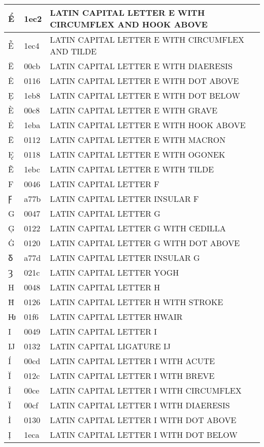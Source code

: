 \documentclass[12pt,letterpaper,openany]{book}
\begin{document}
\begin{center}
\begin{supertabular}{|m{0.25in}|m{0.5in}|m{4in}|}
Ể & 1ec2 & \scriptsize LATIN CAPITAL LETTER E WITH CIRCUMFLEX AND HOOK ABOVE\\\hline
Ễ & 1ec4 & LATIN CAPITAL LETTER E WITH CIRCUMFLEX AND TILDE\\\hline
Ë & 00cb & LATIN CAPITAL LETTER E WITH DIAERESIS\\\hline
Ė & 0116 & LATIN CAPITAL LETTER E WITH DOT ABOVE\\\hline
Ẹ & 1eb8 & LATIN CAPITAL LETTER E WITH DOT BELOW\\\hline
È & 00c8 & LATIN CAPITAL LETTER E WITH GRAVE\\\hline
Ẻ & 1eba & LATIN CAPITAL LETTER E WITH HOOK ABOVE\\\hline
Ē & 0112 & LATIN CAPITAL LETTER E WITH MACRON\\\hline
Ę & 0118 & LATIN CAPITAL LETTER E WITH OGONEK\\\hline
Ẽ & 1ebc & LATIN CAPITAL LETTER E WITH TILDE\\\hline
F & 0046 & LATIN CAPITAL LETTER F\\\hline
Ꝼ & a77b & LATIN CAPITAL LETTER INSULAR F\\\hline
G & 0047 & LATIN CAPITAL LETTER G\\\hline
Ģ & 0122 & LATIN CAPITAL LETTER G WITH CEDILLA\\\hline
Ġ & 0120 & LATIN CAPITAL LETTER G WITH DOT ABOVE\\\hline
Ᵹ & a77d & LATIN CAPITAL LETTER INSULAR G\\\hline
Ȝ & 021c & LATIN CAPITAL LETTER YOGH\\\hline
H & 0048 & LATIN CAPITAL LETTER H\\\hline
Ħ & 0126 & LATIN CAPITAL LETTER H WITH STROKE\\\hline
Ƕ & 01f6 & LATIN CAPITAL LETTER HWAIR\\\hline
I & 0049 & LATIN CAPITAL LETTER I\\\hline
Ĳ & 0132 & LATIN CAPITAL LIGATURE IJ\\\hline
Í & 00cd & LATIN CAPITAL LETTER I WITH ACUTE\\\hline
Ĭ & 012c & LATIN CAPITAL LETTER I WITH BREVE\\\hline
Î & 00ce & LATIN CAPITAL LETTER I WITH CIRCUMFLEX\\\hline
Ï & 00cf & LATIN CAPITAL LETTER I WITH DIAERESIS\\\hline
İ & 0130 & LATIN CAPITAL LETTER I WITH DOT ABOVE\\\hline
Ị & 1eca & LATIN CAPITAL LETTER I WITH DOT BELOW\\\hline

\end{supertabular}
\end{center}
\end{document}
